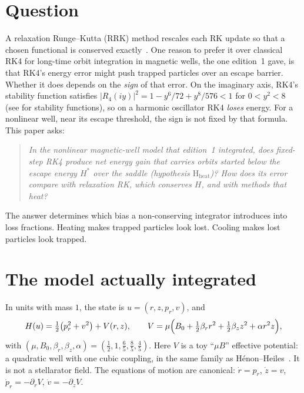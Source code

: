 \documentclass[11pt,a4paper]{article}
\theoremstyle{definition}
\newcommand{\Hs}{H^{*}}
\begin{document}
\section{Question}
\label{sec:intro}
A relaxation Runge--Kutta (RRK) method rescales each RK update so that a chosen functional is conserved exactly~\cite{Ketcheson2019,Ranocha2020}. One reason to prefer it over classical RK4 for long-time orbit integration in magnetic wells, the one edition~1 gave, is that RK4's energy error might push trapped particles over an escape barrier. Whether it does depends on the \emph{sign} of that error. On the imaginary axis, RK4's stability function satisfies $|R_4(iy)|^2=1-y^6/72+y^8/576<1$ for $0<y^2<8$ (see \cite{HairerWanner1996} for stability functions), so on a harmonic oscillator RK4 \emph{loses} energy. For a nonlinear well, near its escape threshold, the sign is not fixed by that formula. This paper asks:

\begin{quote}
\emph{In the nonlinear magnetic-well model that edition~1 integrated, does fixed-step RK4 produce net energy gain that carries orbits started below the escape energy $\Hs$ over the saddle (hypothesis $\mathrm{H_{heat}}$)? How does its error compare with relaxation RK, which conserves $H$, and with methods that heat?}
\end{quote}

The answer determines which bias a non-conserving integrator introduces into loss fractions. Heating makes trapped particles look lost. Cooling makes lost particles look trapped.

\section{The model actually integrated}
\label{sec:model}
In units with mass $1$, the state is $u=(r,z,p_r,v)$, and
\begin{equation}
\label{eq:H}
H(u)=\tfrac12\bigl(p_r^2+v^2\bigr)+V(r,z),\qquad V=\mu\Bigl(B_0+\tfrac12\beta_r r^2+\tfrac12\beta_z z^2+\alpha r^2 z\Bigr),
\end{equation}
with $(\mu,B_0,\beta_r,\beta_z,\alpha)=(\tfrac12,1,\tfrac65,\tfrac85,\tfrac45)$. Here $V$ is a toy ``$\mu B$'' effective potential: a quadratic well with one cubic coupling, in the same family as H\'enon--Heiles~\cite{HenonHeiles1964}. It is not a stellarator field. The equations of motion are canonical: $\dot r=p_r$, $\dot z=v$, $\dot p_r=-\partial_rV$, $\dot v=-\partial_zV$.
\end{document}
